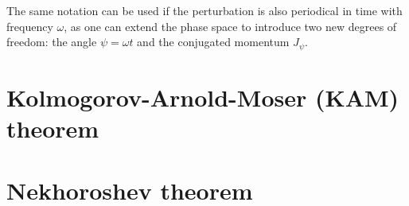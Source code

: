 The same notation can be used if the perturbation is also periodical in time with frequency $\omega$, as one can extend the phase space to introduce two new degrees of freedom: the angle $\psi=\omega t$ and the conjugated momentum $J_\psi$.




\section{Kolmogorov-Arnold-Moser (KAM) theorem}\label{sec:1:kam}

\section{Nekhoroshev theorem}\label{sec:1:nekhoroshev}


